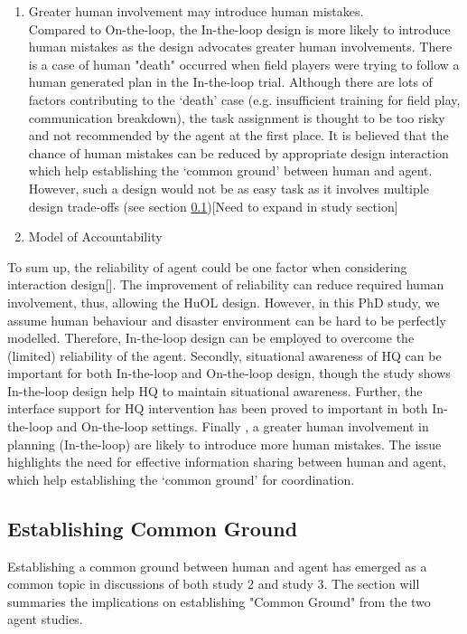 \begin{enumerate}
\item Greater human involvement may introduce human mistakes. \\
Compared to On-the-loop, the In-the-loop design is more likely to introduce human mistakes as the design advocates greater human involvements. There is a case of  human "death" occurred  when field players were trying to follow a human generated plan in the In-the-loop trial.  Although there are lots of factors contributing to the `death' case (e.g. insufficient training for field play, communication breakdown), the task assignment is thought to be too risky and not recommended by the agent at the first place. It is believed that the chance of human mistakes can be reduced by appropriate design interaction which help establishing the `common ground' between human and agent. However, such a design would not be as easy task as it involves multiple design trade-offs  (see section \ref{sec:conclusionCG})[Need to expand in study section]

\item Model of Accountability

\end{enumerate}

To sum up, the reliability of agent could be one factor when considering interaction design[]. The improvement of reliability can reduce required human involvement, thus, allowing the HuOL design. However, in this PhD study, we assume human behaviour and disaster environment can be hard to be perfectly modelled. Therefore, In-the-loop design can be employed to overcome the (limited) reliability of the agent. Secondly, situational awareness of HQ can be important for both In-the-loop and On-the-loop design, though the study shows In-the-loop design help HQ to maintain situational awareness. Further, the interface support for HQ intervention has been proved to important in both In-the-loop and On-the-loop settings. Finally , a greater human involvement in planning (In-the-loop) are likely to introduce more human mistakes. The issue highlights the need for effective information sharing between human and agent, which help establishing the `common ground' for coordination. \\


\subsection{Establishing Common Ground} \label{sec:conclusionCG}
Establishing a common ground between human and agent has emerged as a common topic in discussions of both study 2 and study 3. The section will summaries the implications on establishing "Common Ground" from the two agent studies. \\

